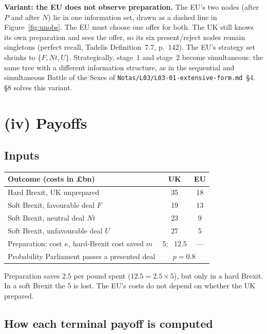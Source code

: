 \documentclass[11pt,a4paper]{article}
\newcommand{\gbp}{\pounds}
\newcommand{\Nt}{\mathit{Nt}}
\newcommand{\dF}{\mathit{F}}
\newcommand{\dU}{\mathit{U}}
\begin{document}
\textbf{Variant: the EU does not observe preparation.} The EU's two nodes (after $P$ and after
$N$) lie in one information set, drawn as a dashed line in Figure~\ref{fig:unobs}. The EU must choose
one offer for both. The UK still knows its own preparation and sees the offer, so its six
present/reject nodes remain singletons (perfect recall, Tadelis Definition~7.7, p.~142). The EU's strategy
set shrinks to $\{\dF,\Nt,\dU\}$. Strategically, stage~1 and stage~2 become simultaneous: the
same tree with a different information structure, as in the sequential and simultaneous Battle of
the Sexes of \texttt{Notas/L03/L03-01-extensive-form.md}~\S4. \S8 solves this variant.

\section{(iv) Payoffs}

\subsection{Inputs}

\begin{center}
\begin{tabular}{lcc}
\toprule
Outcome (costs in \gbp bn) & UK & EU \\
\midrule
Hard Brexit, UK unprepared & 35 & 18 \\
Soft Brexit, favourable deal $\dF$ & 19 & 13 \\
Soft Brexit, neutral deal $\Nt$ & 23 & 9 \\
Soft Brexit, unfavourable deal $\dU$ & 27 & 5 \\
\midrule
Preparation: cost $\kappa$, hard-Brexit cost saved $m$ & 5; \ 12.5 & --- \\
Probability Parliament passes a presented deal & \multicolumn{2}{c}{$p=0.8$} \\
\bottomrule
\end{tabular}
\end{center}

Preparation saves 2.5 per pound spent ($12.5=2.5\times5$), but only in a hard Brexit. In a soft
Brexit the 5 is lost. The EU's costs do not depend on whether the UK prepared.

\subsection{How each terminal payoff is computed}
\end{document}
